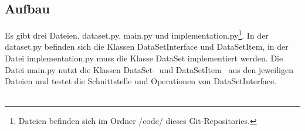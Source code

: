 \documentclass[]{article}
\begin{document}
\subsection{Aufbau}
Es gibt drei Dateien, \grqq dataset.py\grqq, \grqq main.py\grqq{}  und \grqq implementation.py\grqq \footnote{Dateien befinden sich im Ordner \grqq /code/\grqq{} dieses Git-Repositories.}.
In der \grqq dataset.py\grqq{} befinden sich die Klassen \grqq DataSetInterface\grqq{} und \grqq DataSetItem\grqq ,
in der Datei \grqq implementation.py\grqq{} muss die Klasse \grqq DataSet\grqq{} implementiert werden.
Die Datei \grqq main.py\grqq{} nutzt die Klassen \grqq DataSet\ \grqq{} und \grqq DataSetItem\ \grqq{} aus den jeweiligen Dateien und testet die Schnittstelle und Operationen von \grqq DataSetInterface\grqq .\\
\\
\end{document}
